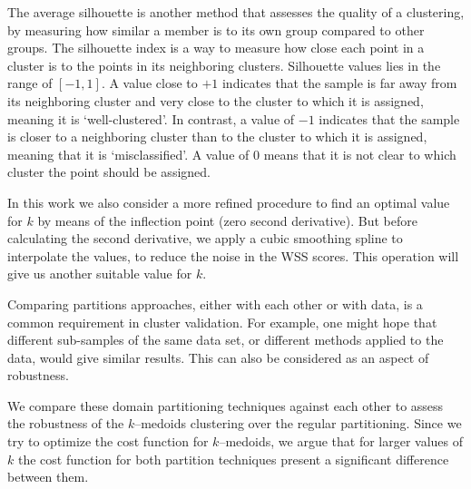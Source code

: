 The average silhouette is another method that assesses the quality of a clustering, by measuring how similar a member is to its own group compared to other groups. The silhouette index is a way to measure how close each point in a cluster is to the points in its neighboring clusters. %
Silhouette values lies in the range of $[-1, 1]$. A value close to $+1$ indicates that the sample is far away from its neighboring cluster and very close to the cluster to which it is assigned, meaning it is `well-clustered'. In contrast, a value of $-1$ indicates that the sample is closer to a neighboring cluster than to the cluster to which it is assigned, meaning that it is `misclassified'. A value of $0$ means that it is not clear to which cluster the point should be assigned. %

In this work we also consider a more refined procedure to find an optimal value for $k$ by means of the inflection point (zero second derivative). But before calculating the second derivative, we apply a cubic smoothing spline to interpolate the values, to reduce the noise in the WSS scores. This operation will give us another suitable value for $k$.

Comparing partitions approaches, either with each other or with data, is a common requirement in cluster validation. For example, one might hope that different sub-samples of the same data set, or different methods applied to the data, would give similar results. This can also be considered as an aspect of robustness.

We compare these domain partitioning techniques against each other to assess the robustness of the $k$--medoids clustering over the regular partitioning. Since we try to optimize the cost function for $k$--medoids, we argue that for larger values of $k$ the cost function for both partition techniques present a significant difference between them. %


